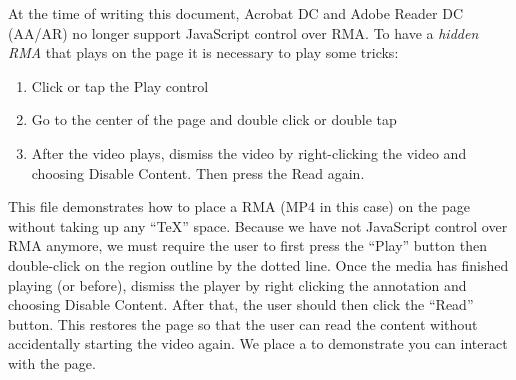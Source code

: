 \documentclass{article}
\let\uif\textsf
\let\app\textsf
\begin{document}
\maketitle

\def\playBtn{\pushButton[\TU{Click to play, shift-click to hide the movie}\CA{Play}
  \AAmouseenter{if(app.viewerVersion >= 20)
    event.target.userName="Press Play, then double-click RMA annot";}
  \AAmouseup{playHiddenRMA("coverRMA")}]{playRMA}{\widthof{\,Read\,}}{11bp}}

\noindent At the time of writing this document, \app{Acrobat DC} and \app{Adobe Reader DC} (\app{AA/AR})
no longer support JavaScript control over RMA. To have a \emph{hidden RMA} that plays
on the page it is necessary to play some tricks:
\vadjust{\makebox[\linewidth][c]
{%
  \raisebox{-\height}[0pt][\depth]{\makebox[0pt][l]
  {%
    \pushButton[\Ff\FfReadOnly\autoCenter{n}\S{S}\BG{}\BC{}\H{N}
      \AApageopen{app.focusRect=false;}
      \AApageclose{app.focusRect=appFocusRect;}
      \AAmouseup{coverMU()}\width{.75\linewidth}]{coverRMA}{320bp}{240bp}
    }%
    \rmAnnot[invisible,width=.75\linewidth,enabled=onclick,
      deactivated=pageclose]{320bp}{240bp}{horse1}%
  }%
}\smash{\makebox[0pt][l]{\raisebox{-\height}{\playBtn}}}}%
\begin{enumerate}
  \item Click or tap the \uif{Play} control
  \item Go to the center of the page and double click or double tap
  \item After the video plays, dismiss the video by right-clicking
  the video and choosing \uif{Disable Content}. Then press the \uif{Read} again.
\end{enumerate}
This file demonstrates how to place a RMA (MP4 in this case) on
the page without taking up any ``\TeX'' space. Because we have
not JavaScript control over RMA anymore, we must require the
user to first press the ``\uif{Play}'' button then double-click
on the region outline by the dotted line. Once the media has
finished playing (or before), dismiss the player by right
clicking the annotation and choosing \uif{Disable Content}.
After that, the user should then click the ``\uif{Read}''
button. This restores the page so that the user can read the
content without accidentally starting the video again. We place
a 
to demonstrate you can interact with the page.
\end{document}
